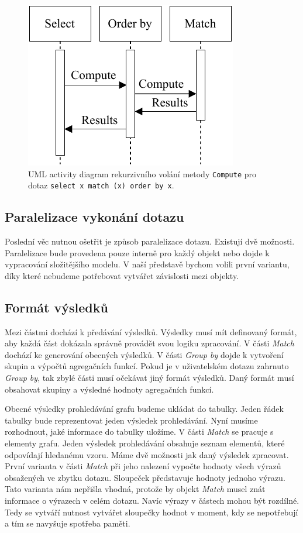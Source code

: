 \begin{figure}[!htp]
\includegraphics{../img/diaQueryObjectsCall.pdf}\centering
\caption{UML activity diagram rekurzivního volání metody \texttt{Compute} pro dotaz \texttt{select x match (x) order by x}.}
\label{figure.diaQueryObjectsCall}
\end{figure}

\subsection{Paralelizace vykonání dotazu}

Poslední věc nutnou ošetřit je způsob paralelizace dotazu.
Existují dvě možnosti.
Paralelizace bude provedena pouze interně pro každý objekt nebo dojde k vypracování složitějšího modelu.
V naší představě bychom volili první variantu, díky které nebudeme potřebovat vytvářet závislosti mezi objekty.

\subsection{Formát výsledků} \label{anal.tables}

Mezi částmi dochází k předávání výsledků.
Výsledky musí mít definovaný formát, aby každá část dokázala správně provádět svou logiku zpracování.
V části \textit{Match} dochází ke generování obecných výsledků.
V části \textit{Group by} dojde k vytvoření skupin a výpočtů agregačních funkcí.
Pokud je v uživatelském dotazu zahrnuto \textit{Group by}, tak zbylé části musí očekávat jiný formát výsledků.
Daný formát musí obsahovat skupiny a výsledné hodnoty agregačních funkcí.

Obecné výsledky prohledávání grafu budeme ukládat do tabulky.
Jeden řádek tabulky bude reprezentovat jeden výsledek prohledávání.
Nyní musíme rozhodnout, jaké informace do tabulky uložíme.
V části \textit{Match} se pracuje s elementy grafu.
Jeden výsledek prohledávání obsahuje seznam elementů, které odpovídají hledanému vzoru.
Máme dvě možnosti jak daný výsledek zpracovat.
První varianta v části \textit{Match} při jeho nalezení vypočte hodnoty všech výrazů obsažených ve zbytku dotazu.
Sloupeček představuje hodnoty jednoho výrazu.
Tato varianta nám nepřišla vhodná, protože by objekt \textit{Match} musel znát informace o výrazech v celém dotazu.
Navíc výrazy v částech mohou být rozdílné.
Tedy se vytváří nutnost vytvářet sloupečky hodnot v moment, kdy se nepotřebují a tím se navyšuje spotřeba paměti.

